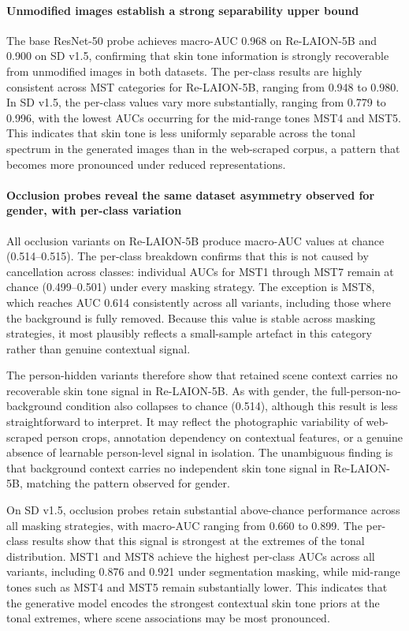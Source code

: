 \paragraph{Unmodified images establish a strong separability upper bound}

The base ResNet-50 probe achieves macro-AUC 0.968 on Re-LAION-5B and 0.900 on SD v1.5, confirming that skin tone information is strongly recoverable from unmodified images in both datasets. The per-class results are highly consistent across MST categories for Re-LAION-5B, ranging from 0.948 to 0.980. In SD v1.5, the per-class values vary more substantially, ranging from 0.779 to 0.996, with the lowest AUCs occurring for the mid-range tones MST4 and MST5. This indicates that skin tone is less uniformly separable across the tonal spectrum in the generated images than in the web-scraped corpus, a pattern that becomes more pronounced under reduced representations.

\paragraph{Occlusion probes reveal the same dataset asymmetry observed for gender, with per-class variation}

All occlusion variants on Re-LAION-5B produce macro-AUC values at chance (0.514--0.515). The per-class breakdown confirms that this is not caused by cancellation across classes: individual AUCs for MST1 through MST7 remain at chance (0.499--0.501) under every masking strategy. The exception is MST8, which reaches AUC 0.614 consistently across all variants, including those where the background is fully removed. Because this value is stable across masking strategies, it most plausibly reflects a small-sample artefact in this category rather than genuine contextual signal.

The person-hidden variants therefore show that retained scene context carries no recoverable skin tone signal in Re-LAION-5B. As with gender, the full-person-no-background condition also collapses to chance (0.514), although this result is less straightforward to interpret. It may reflect the photographic variability of web-scraped person crops, annotation dependency on contextual features, or a genuine absence of learnable person-level signal in isolation. The unambiguous finding is that background context carries no independent skin tone signal in Re-LAION-5B, matching the pattern observed for gender.

On SD v1.5, occlusion probes retain substantial above-chance performance across all masking strategies, with macro-AUC ranging from 0.660 to 0.899. The per-class results show that this signal is strongest at the extremes of the tonal distribution. MST1 and MST8 achieve the highest per-class AUCs across all variants, including 0.876 and 0.921 under segmentation masking, while mid-range tones such as MST4 and MST5 remain substantially lower. This indicates that the generative model encodes the strongest contextual skin tone priors at the tonal extremes, where scene associations may be most pronounced.

